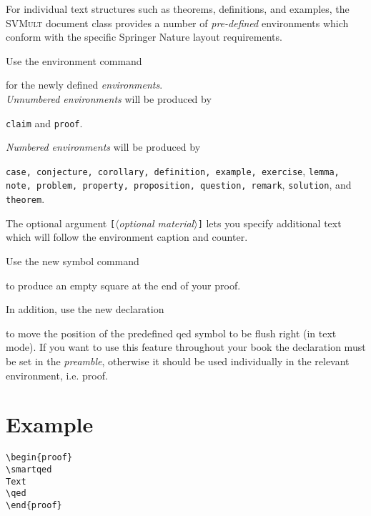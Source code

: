 \documentclass[graybox]{svmult}
\begin{document}
\begin{refguide}
\begin{sloppy}
For individual text structures such as theorems, definitions, and examples, the
\textsc{SVMult} document class provides a number of \textit{pre-defined} environments which
conform with the specific Springer Nature layout requirements.

Use the environment command

\cprotect{}

for the newly defined \textit{environments}.\\
\textit{Unnumbered environments} will be produced by

\verb|claim| and \verb|proof|.

\clearpage

\textit{Numbered environments} will be produced by

\verb|case, conjecture, corollary, definition, example, exercise|, \verb|lemma, note, problem, property, proposition, question, remark|, \verb|solution|, and \verb|theorem|.

The optional argument \verb|[|$\langle$\textit{optional material}$\rangle$\verb|]| lets you specify additional text
which will follow the environment caption and counter.

Use the new symbol command

\cprotect\boxtext{\verb|\qed|}

to produce an empty square at the end of your proof.

In addition, use the new declaration

\cprotect\boxtext{\verb|\smartqed|}

to move the position of the predefined qed symbol to be flush right (in text
mode). If you want to use this feature throughout your book the declaration
must be set in the \textit{preamble}, otherwise it should be used individually in the
relevant environment, i.e. proof.

\section*{Example}
\verb|\begin{proof}|\\
\verb|\smartqed|\\
\verb|Text|\\
\verb|\qed|\\
\verb|\end{proof}|


\end{sloppy}
\end{refguide}
\end{document}

